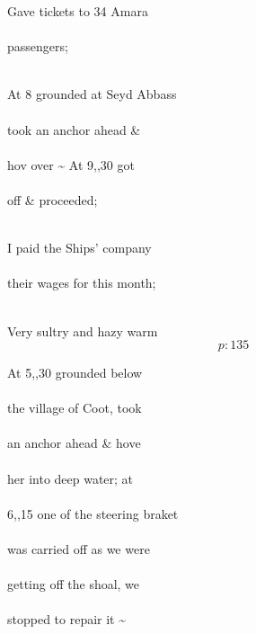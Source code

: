 \documentclass{report}
\begin{document}
	\par{
 	Gave tickets to 34 Amara\ \\\ \\passengers;\ \\\ \\
	}

	\par{
 	At 8 grounded at Seyd Abbass\ \\\ \\took an anchor ahead \&\ \\\ \\hov over \~{} At 9,,30 got\ \\\ \\off \& proceeded;\ \\\ \\
	}

	\par{
 	I paid the Ships’ company\ \\\ \\their wages for this month;\ \\\ \\
	}

	\par{
 	Very sultry and hazy warm\ \\
  \[p: 135 \]

	}



	\par{
 	At 5,,30 grounded below\ \\\ \\the village of Coot, took\ \\\ \\an anchor ahead \& hove\ \\\ \\her into deep water; at\ \\\ \\6,,15 one of the steering braket\ \\\ \\was carried off as we were\ \\\ \\getting off the shoal, we\ \\\ \\stopped to repair it \~{}\ \\\ \\
	}
\end{document}
